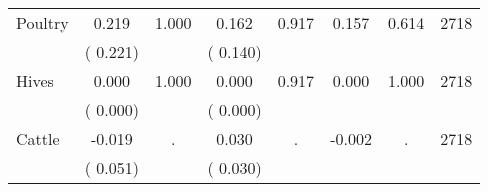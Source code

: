 \begin{tabular}{l*{7}{c}}
 Poultry       &              0.219       &        1.000  &              0.162       &        0.917  &              0.157       &              0.614 &  2718 \\ 
                       &       (       0.221)             &                               &       (       0.140)                     &                               &                                               &                                &                      \\ 

 Hives       &              0.000       &        1.000  &              0.000       &        0.917  &              0.000       &              1.000 &  2718 \\ 
                       &       (       0.000)             &                               &       (       0.000)                     &                               &                                               &                                &                      \\ 

 Cattle       &             -0.019       &            .  &              0.030       &            .  &             -0.002       &                  . &  2718 \\ 
                       &       (       0.051)             &                               &       (       0.030)                     &                               &                                               &                                &                      \\ 

\hline \end{tabular}